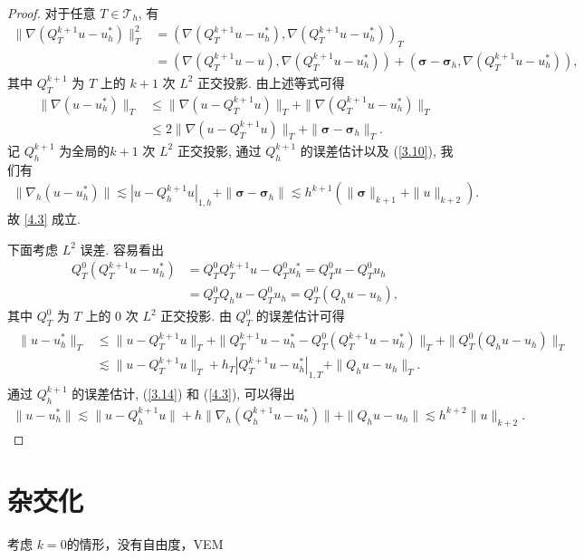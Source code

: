 \begin{proof}
对于任意 $T\in\mathcal{T}_h$, 有
\begin{align*}
\|\nabla(Q^{k+1}_T u-u^\ast_h)\|^2_{T}&=(\nabla(Q^{k+1}_T u-u^\ast_h),\nabla(Q^{k+1}_T u-u^\ast_h))_T\\
&=(\nabla(Q^{k+1}_T u-u),\nabla(Q^{k+1}_T u-u^\ast_h))+(\boldsymbol\sigma-\boldsymbol\sigma_h,\nabla(Q^{k+1}_T u-u^\ast_h)),
\end{align*}
其中 $Q^{k+1}_T$ 为 $T$ 上的 $k+1$ 次 $L^2$ 正交投影. 由上述等式可得
\begin{align*}
\|\nabla(u-u^\ast_h)\|_{T}&\leq\|\nabla(u-Q^{k+1}_T u)\|_{T}+\|\nabla(Q^{k+1}_T u-u^\ast_h)\|_{T}\\
&\leq 2\|\nabla(u-Q^{k+1}_T u)\|_{T}+\|\boldsymbol\sigma-\boldsymbol\sigma_h\|_{T}.
\end{align*}
记 $Q^{k+1}_h$ 为全局的$k+1$ 次 $L^2$ 正交投影, 通过 $Q^{k+1}_h$ 的误差估计以及 (\ref{3.10}), 我们有
\begin{align*}
\|\nabla_h(u-u^\ast_h)\| \lesssim|u-Q^{k+1}_h u|_{1,h}+\|\boldsymbol\sigma-\boldsymbol\sigma_h\|\lesssim h^{k+1}(\|\boldsymbol\sigma\|_{k+1}+\|u\|_{k+2}).
\end{align*}
故 \eqref{4.3} 成立.

下面考虑 $L^2$ 误差. 容易看出
\begin{align*}
Q^0_T(Q^{k+1}_T u-u^\ast_h)&=Q^0_TQ^{k+1}_T u-Q^0_T u^\ast_h=Q^0_T u-Q^0_T u_h\\
&=Q^0_T Q_h u-Q^0_T u_h=Q^0_T(Q_h u-u_h),
\end{align*}
其中 $Q^0_T$ 为 $T$ 上的 $0$ 次 $L^2$ 正交投影. 由 $Q^0_T$ 的误差估计可得
\begin{align}\begin{split}
\label{4.4}
\|u-u^\ast_h\|_{T}&\leq \|u-Q^{k+1}_T u\|_{T}+\|Q^{k+1}_T u-u^\ast_h-Q^0_T(Q^{k+1}_T u-u^\ast_h)\|_{T}+\|Q^0_T(Q_h u-u_h)\|_{T}\\
&\lesssim\|u-Q^{k+1}_T u\|_{T}+h_T|Q^{k+1}_T u-u^\ast_h|_{1,T}+\|Q_h u-u_h\|_{T}.
\end{split}
\end{align}
通过 $Q^{k+1}_h$ 的误差估计, (\ref{3.14}) 和 (\ref{4.3}), 可以得出
\begin{align*}
\|u-u^\ast_h\|\lesssim\|u-Q^{k+1}_h u\|+h\|\nabla_h(Q^{k+1}_h u-u^\ast_h)\| +\|Q_h u-u_h\|\lesssim h^{k+2} \|u\|_{k+2}.
\end{align*}
\end{proof}

\section{杂交化}
考虑 $k=0$的情形，没有自由度，VEM
